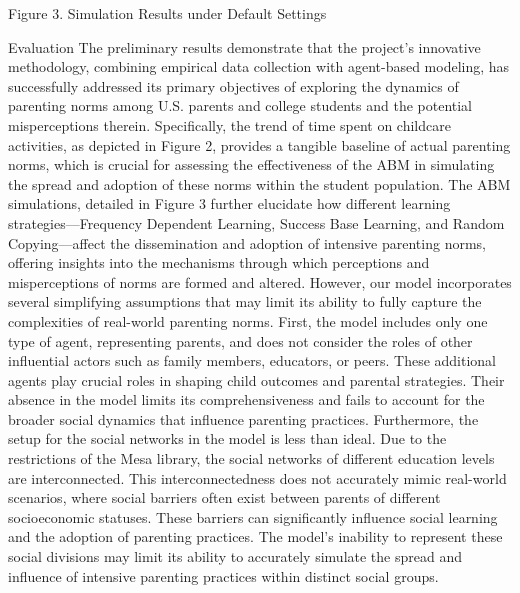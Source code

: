 Figure 3. Simulation Results under Default Settings

Evaluation
The preliminary results demonstrate that the project's innovative methodology, combining empirical data collection with agent-based modeling, has successfully addressed its primary objectives of exploring the dynamics of parenting norms among U.S. parents and college students and the potential misperceptions therein. Specifically, the trend of time spent on childcare activities, as depicted in Figure 2, provides a tangible baseline of actual parenting norms, which is crucial for assessing the effectiveness of the ABM in simulating the spread and adoption of these norms within the student population. The ABM simulations, detailed in Figure 3 further elucidate how different learning strategies—Frequency Dependent Learning, Success Base Learning, and Random Copying—affect the dissemination and adoption of intensive parenting norms, offering insights into the mechanisms through which perceptions and misperceptions of norms are formed and altered.
However, our model incorporates several simplifying assumptions that may limit its ability to fully capture the complexities of real-world parenting norms. First, the model includes only one type of agent, representing parents, and does not consider the roles of other influential actors such as family members, educators, or peers. These additional agents play crucial roles in shaping child outcomes and parental strategies. Their absence in the model limits its comprehensiveness and fails to account for the broader social dynamics that influence parenting practices.
Furthermore, the setup for the social networks in the model is less than ideal. Due to the restrictions of the Mesa library, the social networks of different education levels are interconnected. This interconnectedness does not accurately mimic real-world scenarios, where social barriers often exist between parents of different socioeconomic statuses. These barriers can significantly influence social learning and the adoption of parenting practices. The model's inability to represent these social divisions may limit its ability to accurately simulate the spread and influence of intensive parenting practices within distinct social groups.
